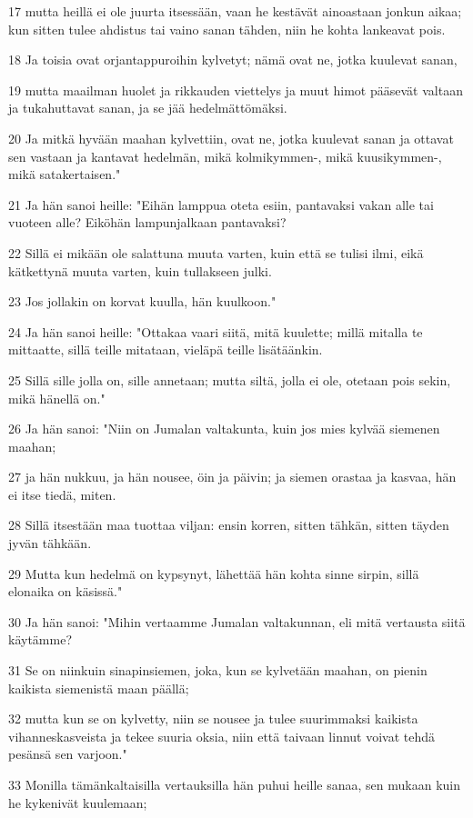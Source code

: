 \par 17 mutta heillä ei ole juurta itsessään, vaan he kestävät ainoastaan jonkun aikaa; kun sitten tulee ahdistus tai vaino sanan tähden, niin he kohta lankeavat pois.
\par 18 Ja toisia ovat orjantappuroihin kylvetyt; nämä ovat ne, jotka kuulevat sanan,
\par 19 mutta maailman huolet ja rikkauden viettelys ja muut himot pääsevät valtaan ja tukahuttavat sanan, ja se jää hedelmättömäksi.
\par 20 Ja mitkä hyvään maahan kylvettiin, ovat ne, jotka kuulevat sanan ja ottavat sen vastaan ja kantavat hedelmän, mikä kolmikymmen-, mikä kuusikymmen-, mikä satakertaisen."
\par 21 Ja hän sanoi heille: "Eihän lamppua oteta esiin, pantavaksi vakan alle tai vuoteen alle? Eiköhän lampunjalkaan pantavaksi?
\par 22 Sillä ei mikään ole salattuna muuta varten, kuin että se tulisi ilmi, eikä kätkettynä muuta varten, kuin tullakseen julki.
\par 23 Jos jollakin on korvat kuulla, hän kuulkoon."
\par 24 Ja hän sanoi heille: "Ottakaa vaari siitä, mitä kuulette; millä mitalla te mittaatte, sillä teille mitataan, vieläpä teille lisätäänkin.
\par 25 Sillä sille jolla on, sille annetaan; mutta siltä, jolla ei ole, otetaan pois sekin, mikä hänellä on."
\par 26 Ja hän sanoi: "Niin on Jumalan valtakunta, kuin jos mies kylvää siemenen maahan;
\par 27 ja hän nukkuu, ja hän nousee, öin ja päivin; ja siemen orastaa ja kasvaa, hän ei itse tiedä, miten.
\par 28 Sillä itsestään maa tuottaa viljan: ensin korren, sitten tähkän, sitten täyden jyvän tähkään.
\par 29 Mutta kun hedelmä on kypsynyt, lähettää hän kohta sinne sirpin, sillä elonaika on käsissä."
\par 30 Ja hän sanoi: "Mihin vertaamme Jumalan valtakunnan, eli mitä vertausta siitä käytämme?
\par 31 Se on niinkuin sinapinsiemen, joka, kun se kylvetään maahan, on pienin kaikista siemenistä maan päällä;
\par 32 mutta kun se on kylvetty, niin se nousee ja tulee suurimmaksi kaikista vihanneskasveista ja tekee suuria oksia, niin että taivaan linnut voivat tehdä pesänsä sen varjoon."
\par 33 Monilla tämänkaltaisilla vertauksilla hän puhui heille sanaa, sen mukaan kuin he kykenivät kuulemaan;
